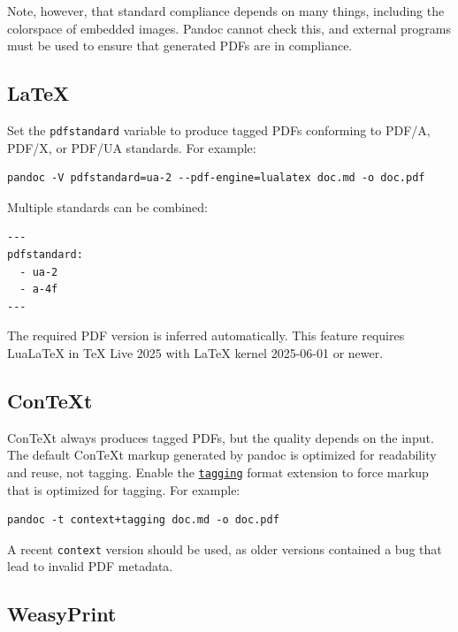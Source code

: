 \documentclass[
]{article}
\begin{document}
Note, however, that standard compliance depends on many things,
including the colorspace of embedded images. Pandoc cannot check this,
and external programs must be used to ensure that generated PDFs are in
compliance.

\hypertarget{latex}{%
\subsection{LaTeX}\label{latex}}

Set the \texttt{pdfstandard} variable to produce tagged PDFs conforming
to PDF/A, PDF/X, or PDF/UA standards. For example:

\begin{verbatim}
pandoc -V pdfstandard=ua-2 --pdf-engine=lualatex doc.md -o doc.pdf
\end{verbatim}

Multiple standards can be combined:

\begin{verbatim}
---
pdfstandard:
  - ua-2
  - a-4f
---
\end{verbatim}

The required PDF version is inferred automatically. This feature
requires LuaLaTeX in TeX Live 2025 with LaTeX kernel 2025-06-01 or
newer.

\hypertarget{context}{%
\subsection{ConTeXt}\label{context}}

ConTeXt always produces tagged PDFs, but the quality depends on the
input. The default ConTeXt markup generated by pandoc is optimized for
readability and reuse, not tagging. Enable the
\protect\hyperlink{extension--tagging}{\texttt{tagging}} format
extension to force markup that is optimized for tagging. For example:

\begin{verbatim}
pandoc -t context+tagging doc.md -o doc.pdf
\end{verbatim}

A recent \texttt{context} version should be used, as older versions
contained a bug that lead to invalid PDF metadata.

\hypertarget{weasyprint}{%
\subsection{WeasyPrint}\label{weasyprint}}
\end{document}
